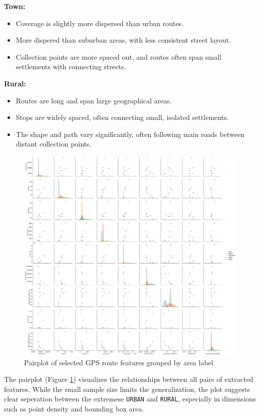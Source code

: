 \documentclass[a4paper,12pt,twoside]{scrreprt}
\begin{document}
\textbf{Town:}
\begin{itemize}
  \item Coverage is slightly more dispersed than urban routes.
  \item More dispered than suburban areas, with less consistent street layout.
  \item Collection points are more spaced out, and routes often span small
        settlements with connecting streets.
\end{itemize}

\textbf{Rural:}
\begin{itemize}
  \item Routes are long and span large geographical areas.
  \item Stops are widely spaced, often connecting small, isolated settlements.
  \item The shape and path vary significantly, often following main roads
        between distant collection points.
\end{itemize}

\begin{figure}[htbp]
  \centering
  \includegraphics[width=\textwidth]{Figures/sample_pairplot.png}
  \caption{Pairplot of selected GPS route features grouped by area label}
  \label{fig:sample_pairplot}
\end{figure}
\FloatBarrier

The pairplot (Figure \ref{fig:sample_pairplot}) visualizes the relationships
between all pairs of extracted features.
While the small sample size limits the generalization, the plot suggests clear
seperation between the extremese \texttt{URBAN} and \texttt{RURAL}, especially
in dimensions such as point density and bounding box area.
\end{document}
